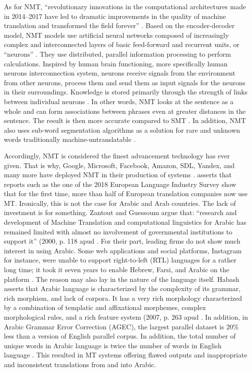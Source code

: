 \documentclass[english]{textolivre}
\begin{document}
As for NMT, “revolutionary innovations in the computational architectures made in 2014–2017 have led to dramatic improvements in the quality of machine translation and transformed the field forever” \cite[p. 6]{balashov_boundaries_2022}. Based on the encoder-decoder model, NMT models use artificial neural networks composed of increasingly complex and interconnected layers of basic feed-forward and recurrent units, or “neurons” \cite{rivera-trigueros_machine_2022}. They use distributed, parallel information processing to perform calculations. Inspired by human brain functioning, more specifically human neurons interconnection system, neurons receive signals from the environment from other neurons, process them and send them as input signals for the neurons in their surroundings. Knowledge is stored primarily through the strength of links between individual neurons \cite[p. 501]{benkov2020neural}. In other words, NMT looks at the sentence as a whole and can form associations between phrases even at greater distances in the sentence. The result is then more accurate compared to SMT \cite[p. 499]{benkov2020neural}. In addition, NMT also uses sub-word segmentation algorithms as a solution for rare and unknown words traditionally machine-untranslatable \cite{balashov_boundaries_2022}.

Accordingly, NMT is considered the finest advancement technology has ever given. That is why, Google, Microsoft, Facebook, Amazon, SDL, Yandex, and many more have deployed NMT in their production of systems \cite[p. 343]{stahlberg_neural_2020}. \textcite[p. 150]{loock2020no} asserts that reports such as the one of the 2018 European Language Industry Survey show that for the first time, more than half of European translation companies now use MT. Ironically, this is not the case for Arabic and Arab countries. The lack of investment is for something. Zantout and Guessoum argue that: “research and development of Machine Translation and computational linguistics for Arabic has remained limited with almost no involvement of governmental institutions to support it” (2000, p. 118 apud \textcite[p. 135]{jaber2015landscape}. For their part, leading firms do not show much interest in using Arabic. Some web applications and social platforms, Instagram for instance, were unable to support right-to-left (RTL) languages for a rather long time; it took it seven years to enable Hebrew, Farsi, and Arabic on the platform \cite[p. 8]{desjardins_when_2021}. The reason may also lay in the nature of the language itself. Habash asserts that Arabic language is characterized by the complexity of its grammar, rich morphism, and lack of corpora. It has a very rich morphology characterized by a combination of templatic and affixational morphemes, complex morphological rules, and a rich feature system (2007, p. 263 apud \textcite{izwaini2015machine}. In addition, in Arabic Grammar Error Correction (AGEC), the largest parallel dataset is 20\% less than a version of English parallel corpus. In addition, the total number of unique words in Arabic language is twice the number of words in English language \cite[p. 304]{solyman_synthetic_2021}. This resulted in MT systems offering flawed outputs and inappropriate and inconsistent translations from and into Arabic. 
\end{document}

